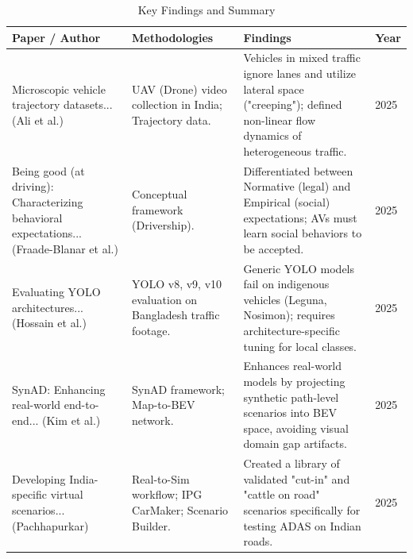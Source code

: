 \begin{table}[h!]
    \centering
    \begin{tabular}{|p{3.5cm}|p{4cm}|p{3.9cm}|p{1.9cm}|}
    \hline
    \textbf{Paper / Author} & \textbf{Methodologies} & \textbf{Findings}& \textbf{Year}\\
    \hline
    Microscopic vehicle trajectory datasets... (Ali et al.) & 
    UAV (Drone) video collection in India; Trajectory data. & 
    Vehicles in mixed traffic ignore lanes and utilize lateral space ("creeping"); defined non-linear flow dynamics of heterogeneous traffic. & 
    2025 \\
    \hline
    Being good (at driving): Characterizing behavioral expectations... (Fraade-Blanar et al.) & 
    Conceptual framework (Drivership). & 
    Differentiated between Normative (legal) and Empirical (social) expectations; AVs must learn social behaviors to be accepted. & 
    2025 \\
    \hline
    Evaluating YOLO architectures... (Hossain et al.) & 
    YOLO v8, v9, v10 evaluation on Bangladesh traffic footage. & 
    Generic YOLO models fail on indigenous vehicles (Leguna, Nosimon); requires architecture-specific tuning for local classes. & 
    2025 \\
    \hline
    SynAD: Enhancing real-world end-to-end... (Kim et al.) & 
    SynAD framework; Map-to-BEV network. & 
    Enhances real-world models by projecting synthetic path-level scenarios into BEV space, avoiding visual domain gap artifacts. & 
    2025 \\
    \hline
    Developing India-specific virtual scenarios... (Pachhapurkar) & 
    Real-to-Sim workflow; IPG CarMaker; Scenario Builder. & 
    Created a library of validated "cut-in" and "cattle on road" scenarios specifically for testing ADAS on Indian roads. & 
    2025 \\
    \hline
    \end{tabular}
    \caption{Key Findings and Summary}
    \label{tab:placeholder}
\end{table}

